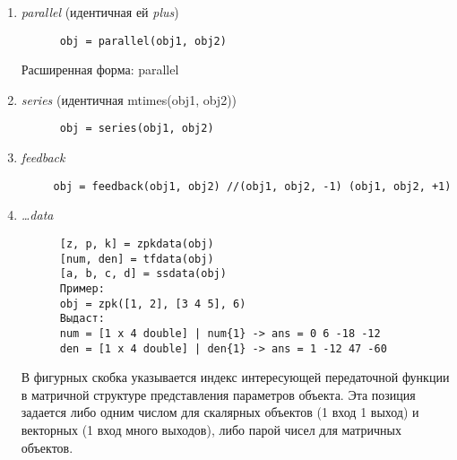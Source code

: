 \begin{enumerate}
  \item \textit{parallel} (идентичная ей \textit{plus})
    \begin{verbatim}
      obj = parallel(obj1, obj2) 
    \end{verbatim}
    \par
    Расширенная форма: parallel

  \item \textit{series} (идентичная mtimes(obj1, obj2))
    \begin{verbatim}
      obj = series(obj1, obj2) 
    \end{verbatim}

  \item \textit{feedback}
    \begin{verbatim}
     obj = feedback(obj1, obj2) //(obj1, obj2, -1) (obj1, obj2, +1)
    \end{verbatim}
    \begin{figure}[h!]
      \centering
    \end{figure}

      \item \textit{\dots data}
    \begin{verbatim}
      [z, p, k] = zpkdata(obj)
      [num, den] = tfdata(obj)
      [a, b, c, d] = ssdata(obj)  
      Пример:
      obj = zpk([1, 2], [3 4 5], 6)
      Выдаст:
      num = [1 x 4 double] | num{1} -> ans = 0 6 -18 -12
      den = [1 x 4 double] | den{1} -> ans = 1 -12 47 -60
    \end{verbatim}
    В фигурных скобка указывается индекс интересующей передаточной функции в
    матричной структуре представления параметров объекта. Эта позиция задается
    либо одним числом для скалярных объектов (1 вход 1 выход) и векторных (1
    вход много выходов), либо парой чисел для матричных объектов.\par


\end{enumerate}
